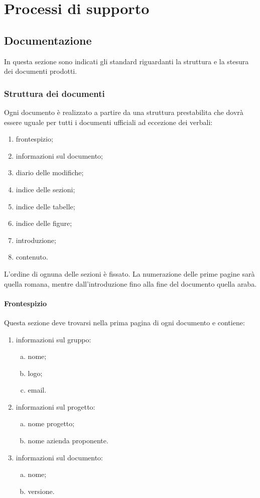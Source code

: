 \documentclass[../NormeProgetto.text]{subfiles}
\begin{document}
\section{Processi di supporto}
\subsection{Documentazione}
In questa sezione sono indicati gli standard riguardanti la struttura e la stesura dei documenti prodotti.
	\subsubsection{Struttura dei documenti}
		Ogni documento è realizzato a partire da una struttura prestabilita che dovrà essere uguale per tutti i documenti ufficiali ad eccezione dei verbali:
		\begin{enumerate}
			\item frontespizio;
			\item informazioni sul documento;
			\item diario delle modifiche;
			\item indice delle sezioni;
			\item indice delle tabelle;
			\item indice delle figure;
			\item introduzione;
			\item contenuto.
		\end{enumerate}
		L'ordine di ognuna delle sezioni è fissato. La numerazione delle prime pagine sarà quella romana, mentre dall'introduzione fino alla fine del documento quella araba.

		\paragraph{Frontespizio}
			Questa sezione deve trovarsi nella prima pagina di ogni documento e contiene:
			\begin{enumerate}
				\item informazioni sul gruppo:
					\begin{enumerate}[a.]
						\item nome;
						\item logo;
						\item email.
					\end{enumerate}
				\item informazioni sul progetto:
					\begin{enumerate}[a.]
						\item nome progetto;
						\item nome azienda proponente.
					\end{enumerate}
				\item informazioni sul documento:
					\begin{enumerate}[a.]
						\item nome;
						\item versione.
					\end{enumerate}
			\end{enumerate}
\end{document}
